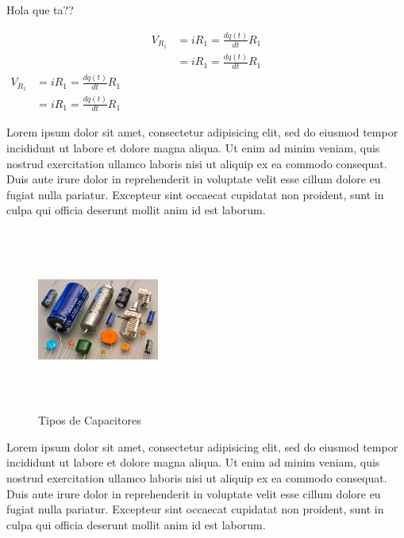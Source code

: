 \documentclass[12pt]{article}
\newcommand{\derivada}[2]{\displaystyle{\frac{d#1}{d#2}}}
\begin{document}
	\begin{multicols}{2}
		Hola que ta??

		\begin{equation}
			\begin{split}
			V_{R_1}&=iR_1=\derivada{q(t)}{t}R_1\\
			&=iR_1=\derivada{q(t)}{t}R_1
			\end{split}
		\end{equation}
		$
		\begin{array}{ll}
			V_{R_1}&=iR_1=\derivada{q(t)}{t}R_1\\
			&=iR_1=\derivada{q(t)}{t}R_1
		\end{array}
		$

		Lorem ipsum dolor sit amet, consectetur adipisicing elit, 
		sed do eiusmod tempor incididunt ut labore et dolore magna 
		aliqua. Ut enim ad minim veniam, quis nostrud exercitation 
		ullamco laboris nisi ut aliquip ex ea commodo consequat. 
		Duis aute irure dolor in reprehenderit in voluptate velit 
		esse cillum dolore eu fugiat nulla pariatur. Excepteur sint 
		occaecat cupidatat non proident, sunt in culpa qui officia 
		deserunt mollit anim id est laborum.
		
		\begin{figure}[H]
			\centering
			\includegraphics[width=4cm, height=6cm]{imagenes/capacitores.jpg}
			\caption{Tipos de Capacitores}
			\label{FIG:Capacitores}
		\end{figure}

		Lorem ipsum dolor sit amet, consectetur adipisicing elit, sed 
		do eiusmod tempor incididunt ut labore et dolore magna aliqua. 
		Ut enim ad minim veniam, quis nostrud exercitation ullamco 
		laboris nisi ut aliquip ex ea commodo consequat. Duis aute irure 
		dolor in reprehenderit in voluptate velit esse cillum dolore eu 
		fugiat nulla pariatur. Excepteur sint occaecat cupidatat non 
		proident, sunt in culpa qui officia deserunt mollit anim id 
		est laborum.
		

\end{multicols}
\end{document}
